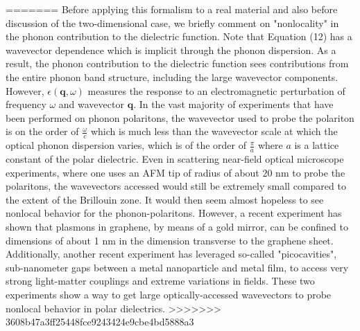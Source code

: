 \documentclass[superscriptaddress,reprint,prb]{revtex4-1}
\begin{document}
=======
Before applying this formalism to a real material and also before discussion of the two-dimensional case, we briefly comment on "nonlocality" in the phonon contribution to the dielectric function. Note that Equation (12) has a wavevector dependence which is implicit through the phonon dispersion. As a result, the phonon contribution to the dielectric function sees contributions from the entire phonon band structure, including the large wavevector components. However, $\epsilon(\mathbf{q},\omega)$ measures the response to an electromagnetic perturbation of frequency $\omega$ and wavevector $\mathbf{q}$. In the vast majority of experiments that have been performed on phonon polaritons, the wavevector used to probe the polariton is on the order of $\frac{\omega}{c}$ which is much less than the wavevector scale at which the optical phonon dispersion varies, which is of the order of $\frac{\pi}{a}$ where $a$ is a lattice constant of the polar dielectric.  Even in scattering near-field optical microscope experiments, where one uses an AFM tip of radius of about $20$ nm to probe the polaritons, the wavevectors accessed would still be extremely small compared to the extent of the Brillouin zone. It would then seem almost hopeless to see nonlocal behavior for the phonon-polaritons. However, a recent experiment \cite{iranzo2018probing} has shown that plasmons in graphene, by means of a gold mirror, can be confined to dimensions of about 1 nm in the dimension transverse to the graphene sheet. Additionally, another recent experiment \cite{benz2016single} has leveraged so-called "picocavities", sub-nanometer gaps between a metal nanoparticle and metal film, to access very strong light-matter couplings and extreme variations in fields. These two experiments show a way to get large optically-accessed wavevectors to probe nonlocal behavior in polar dielectrics.
>>>>>>> 3608b47a3ff25448fce9243424e9cbe4bd5888a3
\end{document}

